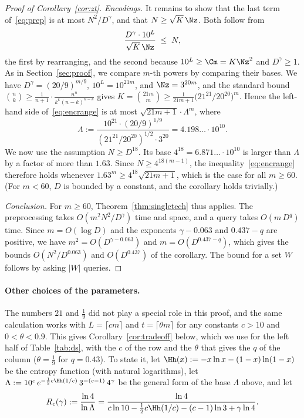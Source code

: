 \begin{proof}[Proof of Corollary~\ref{cor:zt}]
\emph{Encodings.} It remains to show that the last term of~\eqref{eq:prep} is at most $N^2/D^{\gamma}$, and that $N\ge\sqrt K\,\Nz$. Both follow from
\begin{equation}\label{eq:encrange}
\frac{D^{\gamma}\cdot10^L}{\sqrt K\,\Nz}\;\le\;N ,
\end{equation}
the first by rearranging, and the second because $10^L\ge\Cm=K\Nz^2$ and $D^{\gamma}\ge1$. As in Section~\ref{sec:proof}, we compare $m$-th powers by comparing their bases. We have $D^{\gamma}=(20/9)^{m/9}$, $10^L=10^{21m}$, and $\Nz=3^{20m}$, and the standard bound $\binom nk\ge\frac1{n+1}\cdot\frac{n^n}{k^k(n-k)^{n-k}}$ gives $K=\binom{21m}m\ge\frac1{21m+1}\big(21^{21}/20^{20}\big)^m$. Hence the left-hand side of~\eqref{eq:encrange} is at most $\sqrt{21m+1}\cdot\Lambda^m$, where
\[
\Lambda:=\frac{10^{21}\cdot(20/9)^{1/9}}{(21^{21}/20^{20})^{1/2}\cdot3^{20}}=4.198\ldots\cdot10^{10} .
\]
We now use the assumption $N\ge D^{18}$. Its base $4^{18}=6.871\ldots\cdot10^{10}$ is larger than $\Lambda$ by a factor of more than $1.63$. Since $N\ge4^{18(m-1)}$, the inequality~\eqref{eq:encrange} therefore holds whenever $1.63^m\ge4^{18}\sqrt{21m+1}$, which is the case for all $m\ge60$. (For $m<60$, $D$ is bounded by a constant, and the corollary holds trivially.)

\emph{Conclusion.} For $m\ge60$, Theorem~\ref{thm:singletech} thus applies. The preprocessing takes $O(m^2N^2/D^{\gamma})$ time and space, and a query takes $O(m\,D^{q})$ time. Since $m=O(\log D)$ and the exponents $\gamma-0.063$ and $0.437-q$ are positive, we have $m^2=O(D^{\gamma-0.063})$ and $m=O(D^{0.437-q})$, which gives the bounds $O(N^2/D^{0.063})$ and $O(D^{0.437})$ of the corollary. The bound for a set $W$ follows by asking $|W|$ queries.
\end{proof}

\paragraph{Other choices of the parameters.}
The numbers $21$ and $\frac19$ did not play a special role in this proof, and the same calculation works with $L=\lceil cm\rceil$ and $t=\lceil\theta m\rceil$ for any constants $c>10$ and $0<\theta<0.9$. This gives Corollary~\ref{cor:tradeoff} below, which we use for the left half of Table~\ref{tab:ds}, with the $c$ of the row and the $\theta$ that gives the $q$ of the column ($\theta=\frac19$ for $q=0.43$). To state it, let $\Hh(x):=-x\ln x-(1-x)\ln(1-x)$ be the entropy function (with natural logarithms), let $\Lambda:=10^{c}\,e^{-\frac12c\Hh(1/c)}\,3^{-(c-1)}\,4^{\gamma}$ be the general form of the base $\Lambda$ above, and let
\begin{equation}\label{eq:Rc}
R_c(\gamma):=\frac{\ln4}{\ln\Lambda}=\frac{\ln4}{c\ln10-\tfrac12c\Hh(1/c)-(c-1)\ln3+\gamma\ln4} .
\end{equation}

